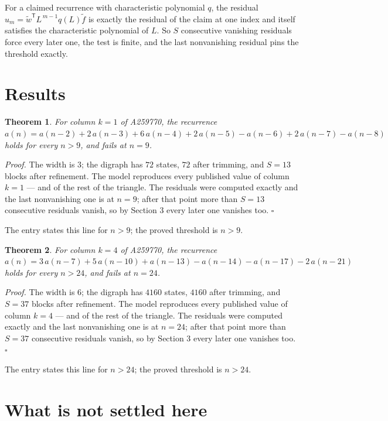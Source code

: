 \documentclass[11pt]{article}
\newtheorem{theorem}{Theorem}
\theoremstyle{definition}
\begin{document}
For a claimed recurrence with characteristic polynomial $q$, the residual $u_m = \tilde w^{\mathsf T}L^{\,m-1}q(L)\tilde f$ is exactly the residual of the claim at one index and itself satisfies the characteristic polynomial of $L$. So $S$ consecutive vanishing residuals force every later one, the test is finite, and the last nonvanishing residual pins the threshold exactly.

\section{Results}

\begin{theorem} For column $k = 1$ of A259770, the recurrence $a(n) = a(n-2) + 2\,a(n-3) + 6\,a(n-4) + 2\,a(n-5) - a(n-6) + 2\,a(n-7) - a(n-8)$ holds for every $n > 9$, and fails at $n = 9$.\end{theorem}

{\itshape Proof.} The width is $3$; the digraph has $72$ states, $72$ after trimming, and $S = 13$ blocks after refinement. The model reproduces every published value of column $k = 1$ --- and of the rest of the triangle. The residuals were computed exactly and the last nonvanishing one is at $n = 9$; after that point more than $S = 13$ consecutive residuals vanish, so by Section 3 every later one vanishes too. $\square$

The entry states this line for $n > 9$; the proved threshold is $n > 9$.

\begin{theorem} For column $k = 4$ of A259770, the recurrence $a(n) = 3\,a(n-7) + 5\,a(n-10) + a(n-13) - a(n-14) - a(n-17) - 2\,a(n-21)$ holds for every $n > 24$, and fails at $n = 24$.\end{theorem}

{\itshape Proof.} The width is $6$; the digraph has $4160$ states, $4160$ after trimming, and $S = 37$ blocks after refinement. The model reproduces every published value of column $k = 4$ --- and of the rest of the triangle. The residuals were computed exactly and the last nonvanishing one is at $n = 24$; after that point more than $S = 37$ consecutive residuals vanish, so by Section 3 every later one vanishes too. $\square$

The entry states this line for $n > 24$; the proved threshold is $n > 24$.

\section{What is not settled here}
\end{document}
